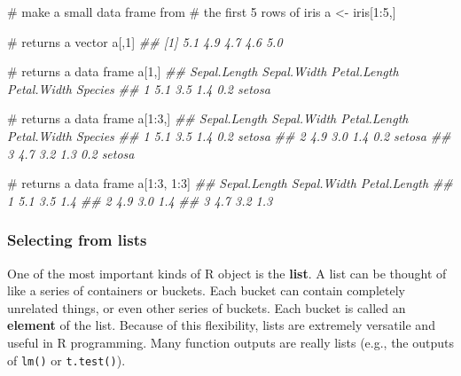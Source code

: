 \documentclass[
  13,
  letterpaper,
]{report}
\newenvironment{Shaded}{\begin{snugshade}}{\end{snugshade}}
\newcommand{\CommentTok}[1]{\textcolor[rgb]{0.37,0.37,0.37}{#1}}
\newcommand{\DecValTok}[1]{\textcolor[rgb]{0.68,0.00,0.00}{#1}}
\newcommand{\DocumentationTok}[1]{\textcolor[rgb]{0.37,0.37,0.37}{\textit{#1}}}
\newcommand{\NormalTok}[1]{\textcolor[rgb]{0.00,0.23,0.31}{#1}}
\newcommand{\OtherTok}[1]{\textcolor[rgb]{0.00,0.23,0.31}{#1}}
\newcommand{\SpecialCharTok}[1]{\textcolor[rgb]{0.37,0.37,0.37}{#1}}
\begin{document}
\begin{Shaded}
\begin{Highlighting}[]
\CommentTok{\# make a small data frame from}
\CommentTok{\# the first 5 rows of iris}
\NormalTok{a }\OtherTok{\textless{}{-}}\NormalTok{ iris[}\DecValTok{1}\SpecialCharTok{:}\DecValTok{5}\NormalTok{,]}

\CommentTok{\# returns a vector}
\NormalTok{a[,}\DecValTok{1}\NormalTok{]}
\DocumentationTok{\#\# [1] 5.1 4.9 4.7 4.6 5.0}

\CommentTok{\# returns a data frame}
\NormalTok{a[}\DecValTok{1}\NormalTok{,]}
\DocumentationTok{\#\#   Sepal.Length Sepal.Width Petal.Length Petal.Width Species}
\DocumentationTok{\#\# 1          5.1         3.5          1.4         0.2  setosa}

\CommentTok{\# returns a data frame}
\NormalTok{a[}\DecValTok{1}\SpecialCharTok{:}\DecValTok{3}\NormalTok{,]}
\DocumentationTok{\#\#   Sepal.Length Sepal.Width Petal.Length Petal.Width Species}
\DocumentationTok{\#\# 1          5.1         3.5          1.4         0.2  setosa}
\DocumentationTok{\#\# 2          4.9         3.0          1.4         0.2  setosa}
\DocumentationTok{\#\# 3          4.7         3.2          1.3         0.2  setosa}

\CommentTok{\# returns a data frame}
\NormalTok{a[}\DecValTok{1}\SpecialCharTok{:}\DecValTok{3}\NormalTok{, }\DecValTok{1}\SpecialCharTok{:}\DecValTok{3}\NormalTok{]}
\DocumentationTok{\#\#   Sepal.Length Sepal.Width Petal.Length}
\DocumentationTok{\#\# 1          5.1         3.5          1.4}
\DocumentationTok{\#\# 2          4.9         3.0          1.4}
\DocumentationTok{\#\# 3          4.7         3.2          1.3}
\end{Highlighting}
\end{Shaded}

\subsubsection{Selecting from lists}\label{sec-manip-select-bas-list}

One of the most important kinds of R object is the \textbf{list}. A list
can be thought of like a series of containers or buckets. Each bucket
can contain completely unrelated things, or even other series of
buckets. Each bucket is called an \textbf{element} of the list. Because
of this flexibility, lists are extremely versatile and useful in R
programming. Many function outputs are really lists (e.g., the outputs
of \texttt{lm()} or \texttt{t.test()}).
\end{document}
